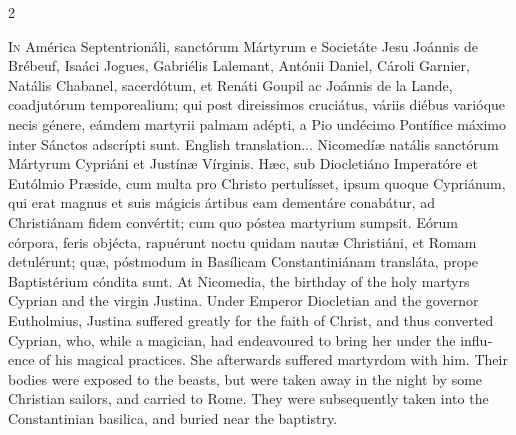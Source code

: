 \begin{paracol}{2}
	\begin{american}
		
		\lettrine[lines=2]{I}{n} América Septentrionáli, sanctórum Mártyrum e
		Societáte Jesu Joánnis de Brébeuf, Isaáci Jogues, Gabriélis Lalemant,
		Antónii Daniel, Cároli Garnier, Natális Chabanel, sacerdótum, et Renáti
		Goupil ac Joánnis de la Lande, coadjutórum temporealium; qui post
		direissimos cruciátus, váriis diébus varióque necis génere, eámdem
		martyrii palmam adépti, a Pio undécimo Pontífice máximo inter Sánctos
		adscrípti sunt.
		\switchcolumn
		English translation...
		\switchcolumn*
		Nicomedíæ natális sanctórum Mártyrum Cypriáni et Justínæ Vírginis. Hæc, sub
		Diocletiáno Imperatóre et Eutólmio Præside, cum multa pro Christo
		pertulísset, ipsum quoque Cypriánum, qui erat magnus et suis mágicis
		ártibus eam dementáre conabátur, ad Christiánam fidem convértit; cum quo
		póstea martyrium sumpsit. Eórum córpora, feris objécta, rapuérunt noctu
		quidam nautæ Christiáni, et Romam detulérunt; quæ, póstmodum in Basílicam
		Constantiniánam transláta, prope Baptistérium cóndita sunt.
		\switchcolumn
		At Nicomedia, the birthday of the holy martyrs Cyprian and the virgin
		Justina. Under Emperor Diocletian and the governor Eutholmius, Justina
		suffered greatly for the faith of Christ, and thus converted Cyprian,
		who, while a magician, had endeavoured to bring her under the influence
		of his magical practices. She afterwards suffered martyrdom with him.
		Their bodies were exposed to the beasts, but were taken away in the
		night by some Christian sailors, and carried to Rome. They were
		subsequently taken into the Constantinian basilica, and buried near the
		baptistry.
		\switchcolumn*

	\end{american}

	\begin{roman}


\end{roman}
\end{paracol}
